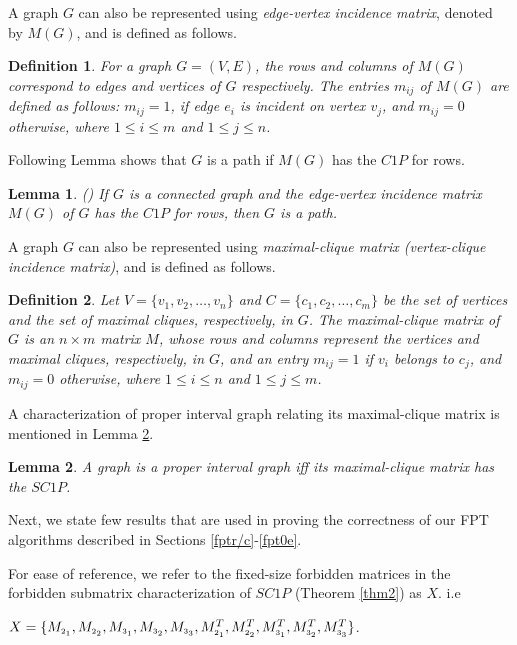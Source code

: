 \documentclass[review, 1p]{elsarticle}
\newtheorem{lemma}{Lemma}
\newtheorem{definition}{Definition}
\begin{document}
\noindent A graph $G$ can also be represented using \textit{edge-vertex incidence matrix}, denoted by $M(G)$, and is defined as follows.
\begin{definition} \label{defn6} \textup{For a graph $G = (V,E)$, the rows and columns of $M(G)$ correspond to edges and vertices of $G$ respectively. The entries $m_{ij}$ of $M(G)$ are defined as follows: $m_{ij}=1$, if edge $e_{i}$ is incident on vertex $v_{j}$, and $m_{ij}=0$ otherwise, where $1 \leq i \leq m$ and $1 \leq j \leq n$.}
\end{definition}
Following Lemma shows that $G$ is a path if $M(G)$ has the $C1P$ for rows.
\begin{lemma}\label{prop4} \textup{(\cite[Theorem 2.2]{dom2009recognition})}
If $G$ is a connected graph and the edge-vertex incidence matrix $M(G)$ of $G$ has the $C1P$ for rows, then $G$ is a path.
\end{lemma}
\noindent A graph $G$ can also be represented using \textit{maximal-clique matrix (\textit{vertex-clique incidence matrix})}, and is defined as follows.
\begin{definition}\label{maxcliq}\textup{Let $V=\{v_{1},v_{2},\ldots,v_{n}\}$  and $C=\{c_{1},c_{2},\ldots,c_{m}\}$  be the set of vertices and the set of maximal cliques, respectively, in $G$. The maximal-clique matrix of $G$ is an $n \times m$ matrix $M$, whose rows and columns represent the vertices and maximal cliques, respectively, in $G$, and an entry $m_{ij}=1$ if $v_{i}$ belongs to $c_{j}$, and $m_{ij}=0$ otherwise, where $1 \leq i \leq n$ and $1 \leq j \leq m$}.
\end{definition}
A characterization of proper interval graph relating its maximal-clique matrix is mentioned in Lemma \ref{lem1}.
 \begin{lemma}\textup{\cite{dom2009recognition}}\label{lem1}
 A graph is a proper interval graph iff its maximal-clique matrix has the $SC1P$.
 \end{lemma}
\noindent Next, we state few results that are used in proving the correctness of our FPT algorithms described in Sections \ref{fptr/c}-\ref{fpt0e}.

\noindent For ease of reference, we refer to the \label{defn1} fixed-size forbidden matrices in the forbidden submatrix characterization of $SC1P$ (Theorem \ref{thm2}) as $X$. i.e 

$X=\{M_{\mathsmaller{2_{1}}}, M_{\mathsmaller{2_{2}}}, M_{\mathsmaller{3_{1}}}, M_{\mathsmaller{3_{2}}}, M_{\mathsmaller{3_{3}}}, {M^{ T}_{\mathsmaller{2_{1}}}}, {M^{T}_{\mathsmaller{2_{2}}}}, {M^{T}_{\mathsmaller{3_{1}}}}, {M^{T}_{\mathsmaller{3_{2}}}}, {M^{T}_{\mathsmaller{3_{3}}}}\}$. 
\end{document}
